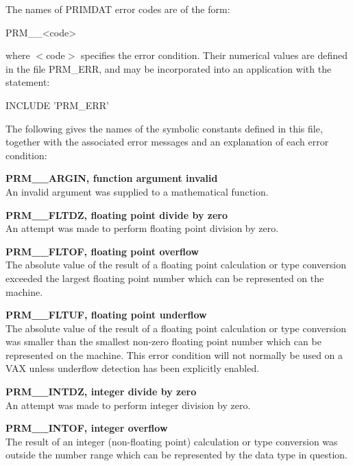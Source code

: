 \documentclass[11pt,nolof]{starlink}
\providecommand{\name}[1]{#1}
\begin{document}
The names of \name{PRIMDAT} error codes are of the form:

\begin{terminalv}
PRM__<code>
\end{terminalv}

where $<$code$>$ specifies the error condition.
Their numerical values are defined in the file \name{PRM\_ERR}, and may be
incorporated into an application with the statement:

\begin{terminalv}
INCLUDE 'PRM_ERR'
\end{terminalv}

The following gives the names of the symbolic constants defined in this
file, together with the associated error messages and an explanation of each
error condition:

\begin{description}

\item \textbf{PRM\_\_ARGIN, function argument invalid}\\
An invalid argument was supplied to a mathematical function.

\item \textbf{PRM\_\_FLTDZ, floating point divide by zero}\\
An attempt was made to perform floating point division by zero.

\item \textbf{PRM\_\_FLTOF, floating point overflow}\\
The absolute value of the result of a floating point calculation or type
conversion exceeded the largest floating point number which can be
represented on the machine.

\item \textbf{PRM\_\_FLTUF, floating point underflow}\\
The absolute value of the result of a floating point calculation or type
conversion was smaller than the smallest non-zero floating point number
which can be represented on the machine.
This error condition will not normally be used on a \name{VAX} unless
underflow detection has been explicitly enabled.

\item \textbf{PRM\_\_INTDZ, integer divide by zero}\\
An attempt was made to perform integer division by zero.

\item \textbf{PRM\_\_INTOF, integer overflow}\\
The result of an integer (non-floating point) calculation or type conversion
was outside the number range which can be represented by the data type in
question.


\end{description}
\end{document}
